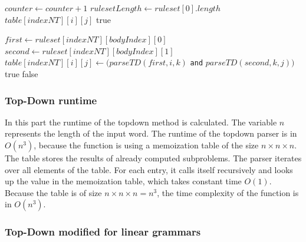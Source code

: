 \documentclass[a4paper, 11pt]{article}
\begin{document}
\begin{center}
\begin{algorithmic}[1]
\State $counter \gets counter+1$
\State $rulesetLength \gets ruleset[0].length$
\State \Return $table[indexNT][i][j]$
\EndIf
{}
\State \Return true
\EndIf
\EndFor

\Else
{}
\State $first \gets ruleset[indexNT][bodyIndex][0]$
\State $second \gets ruleset[indexNT][bodyIndex][1]$
\State $table[indexNT][i][j] \gets (parseTD(first,i,k)$ \texttt{and} $parseTD(second,k,j))$
\State \Return true
\EndIf
\EndFor
\EndIf
\EndFor
\EndIf
\State \Return false
\end{algorithmic}
\hrulefill
\end{center}

\subsubsection{Top-Down runtime}
\label{topdownruntime}

In this part the runtime of the topdown method is calculated.
The variable $n$ represents the length of the input word. 
The runtime of the topdown parser is in $O(n^3)$, because the function is using a memoization table of the size $n \times n \times n$. The table stores the results of already computed subproblems.
The parser iterates over all elements of the table. For each entry, it calls itself recursively and looks up the value in the memoization table, which takes constant time $O(1)$. Because the table is of size $n \times n \times n =n^3$, the time complexity of the function is in $O(n^3)$.



\subsubsection{Top-Down modified for linear grammars}
\label{lineartopdown}
\end{document}
